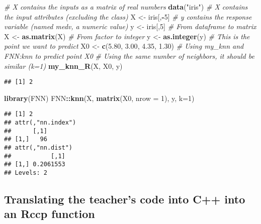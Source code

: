\documentclass[]{article}
\newenvironment{Shaded}{\begin{snugshade}}{\end{snugshade}}
\newcommand{\CommentTok}[1]{\textcolor[rgb]{0.56,0.35,0.01}{\textit{#1}}}
\newcommand{\DataTypeTok}[1]{\textcolor[rgb]{0.13,0.29,0.53}{#1}}
\newcommand{\DecValTok}[1]{\textcolor[rgb]{0.00,0.00,0.81}{#1}}
\newcommand{\FloatTok}[1]{\textcolor[rgb]{0.00,0.00,0.81}{#1}}
\newcommand{\KeywordTok}[1]{\textcolor[rgb]{0.13,0.29,0.53}{\textbf{#1}}}
\newcommand{\NormalTok}[1]{#1}
\newcommand{\OperatorTok}[1]{\textcolor[rgb]{0.81,0.36,0.00}{\textbf{#1}}}
\newcommand{\StringTok}[1]{\textcolor[rgb]{0.31,0.60,0.02}{#1}}
\begin{document}
\begin{Shaded}
\begin{Highlighting}[]
\CommentTok{# X contains the inputs as a matrix of real numbers}
\KeywordTok{data}\NormalTok{(}\StringTok{"iris"}\NormalTok{)}
\CommentTok{# X contains the input attributes (excluding the class)}
\NormalTok{X <-}\StringTok{ }\NormalTok{iris[,}\OperatorTok{-}\DecValTok{5}\NormalTok{]}
\CommentTok{# y contains the response variable (named medv, a numeric value)}
\NormalTok{y <-}\StringTok{ }\NormalTok{iris[,}\DecValTok{5}\NormalTok{]}
\CommentTok{# From dataframe to matrix}
\NormalTok{X <-}\StringTok{ }\KeywordTok{as.matrix}\NormalTok{(X)}
\CommentTok{# From factor to integer}
\NormalTok{y <-}\StringTok{ }\KeywordTok{as.integer}\NormalTok{(y)}
\CommentTok{# This is the point we want to predict}
\NormalTok{X0 <-}\StringTok{ }\KeywordTok{c}\NormalTok{(}\FloatTok{5.80}\NormalTok{, }\FloatTok{3.00}\NormalTok{, }\FloatTok{4.35}\NormalTok{, }\FloatTok{1.30}\NormalTok{)}
\CommentTok{# Using my_knn and FNN:knn to predict point X0}
\CommentTok{# Using the same number of neighbors, it should be similar (k=1)}
\KeywordTok{my_knn_R}\NormalTok{(X, X0, y)}
\end{Highlighting}
\end{Shaded}

\begin{verbatim}
## [1] 2
\end{verbatim}

\begin{Shaded}
\begin{Highlighting}[]
\KeywordTok{library}\NormalTok{(FNN)}
\NormalTok{FNN}\OperatorTok{::}\KeywordTok{knn}\NormalTok{(X, }\KeywordTok{matrix}\NormalTok{(X0, }\DataTypeTok{nrow =} \DecValTok{1}\NormalTok{), y, }\DataTypeTok{k=}\DecValTok{1}\NormalTok{)}
\end{Highlighting}
\end{Shaded}

\begin{verbatim}
## [1] 2
## attr(,"nn.index")
##      [,1]
## [1,]   96
## attr(,"nn.dist")
##           [,1]
## [1,] 0.2061553
## Levels: 2
\end{verbatim}

\newpage

\hypertarget{translating-the-teachers-code-into-c-into-an-rccp-function}{%
\subsection{Translating the teacher's code into C++ into an Rccp
function}\label{translating-the-teachers-code-into-c-into-an-rccp-function}}
\end{document}
